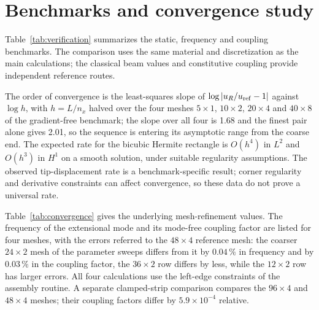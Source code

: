 \FloatBarrier
\section{Benchmarks and convergence study}
\label{app:verification}
\setcounter{table}{0}
\setcounter{figure}{0}

Table~\ref{tab:verification} summarizes the static, frequency and coupling
benchmarks. The comparison uses the same
material and discretization as the main calculations; the classical beam
values and constitutive coupling provide independent reference routes.

\begin{table}[!htbp]
\centering
\small
\caption{Static, frequency and coupling benchmarks, with the obtained and
reference values.}
\label{tab:verification}

\end{table}

The order of convergence is the least-squares slope of
$\log|u_R/u_{\rm ref}-1|$ against $\log h$, with $h=L/n_x$ halved over the
four meshes $5\times1$, $10\times2$, $20\times4$ and $40\times8$ of the
gradient-free benchmark; the slope over all
four is 1.68 and the finest pair alone gives 2.01, so the sequence is entering
its asymptotic range from the coarse end. The expected rate for the bicubic
Hermite rectangle is $O(h^{4})$ in $L^2$ and $O(h^{3})$ in $H^1$ on a smooth
solution, under suitable regularity assumptions. The observed tip-displacement rate is
a benchmark-specific result; corner regularity and derivative constraints
can affect convergence, so these data do not prove a universal rate.

Table~\ref{tab:convergence} gives the underlying mesh-refinement values. The frequency of the extensional mode and its
mode-free coupling factor are listed for four meshes, with the errors referred
to the $48\times4$ reference mesh: the coarser $24\times2$ mesh of the
parameter sweeps differs from it by $0.04\,\%$ in frequency and by
$0.03\,\%$ in the coupling factor, the $36\times2$ row differs by less, while the $12\times2$ row has larger
errors. All four calculations use the left-edge constraints of the assembly
routine. A separate clamped-strip comparison
compares the $96\times4$ and $48\times4$ meshes; their coupling factors
differ by $5.9\times10^{-4}$ relative.




\FloatBarrier
